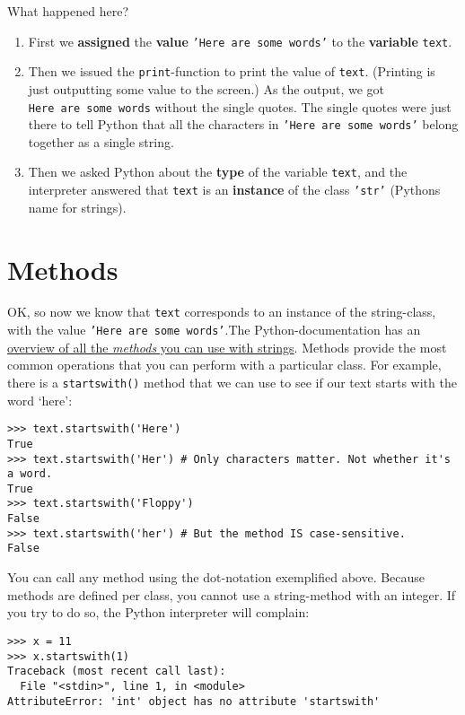\documentclass[12pt]{book}
\begin{document}
\noindent What happened here?

\begin{enumerate}
\item First we \textbf{assigned} the \textbf{value} \texttt{'Here\ are\ some\ words'} to the \textbf{variable} \texttt{text}.
\item Then we issued the \texttt{print}-function to print the value of \texttt{text}. (Printing is just outputting some value to the screen.) As the output, we got \texttt{Here\ are\ some\ words} without the single quotes. The single quotes were just there to tell Python that all the characters in \texttt{'Here\ are\ some\ words'} belong together as a single string.
\item Then we asked Python about the \textbf{type} of the variable \texttt{text}, and the interpreter answered that \texttt{text} is an \textbf{instance} of the class \texttt{'str'} (Pythons name for strings).
\end{enumerate}


\section{Methods}
OK, so now we know that \texttt{text} corresponds to an instance of the string-class, with the value \texttt{'Here are some words'}.The Python-documentation has an \href{https://docs.python.org/3/library/stdtypes.html#string-methods}{overview of all the \emph{methods} you can use with strings}. Methods provide the most common operations that you can perform with a particular class. For example, there is a \texttt{startswith()} method that we can use to see if our text starts with the word `here':

\begin{lstlisting}
>>> text.startswith('Here')
True
>>> text.startswith('Her') # Only characters matter. Not whether it's a word.
True
>>> text.startswith('Floppy')
False
>>> text.startswith('her') # But the method IS case-sensitive.
False
\end{lstlisting}

You can call any method using the dot-notation exemplified above. Because methods are defined per class, you cannot use a string-method with an integer. If you try to do so, the Python interpreter will complain:

\begin{lstlisting}
>>> x = 11
>>> x.startswith(1)
Traceback (most recent call last):
  File "<stdin>", line 1, in <module>
AttributeError: 'int' object has no attribute 'startswith'
\end{lstlisting}
\end{document}
